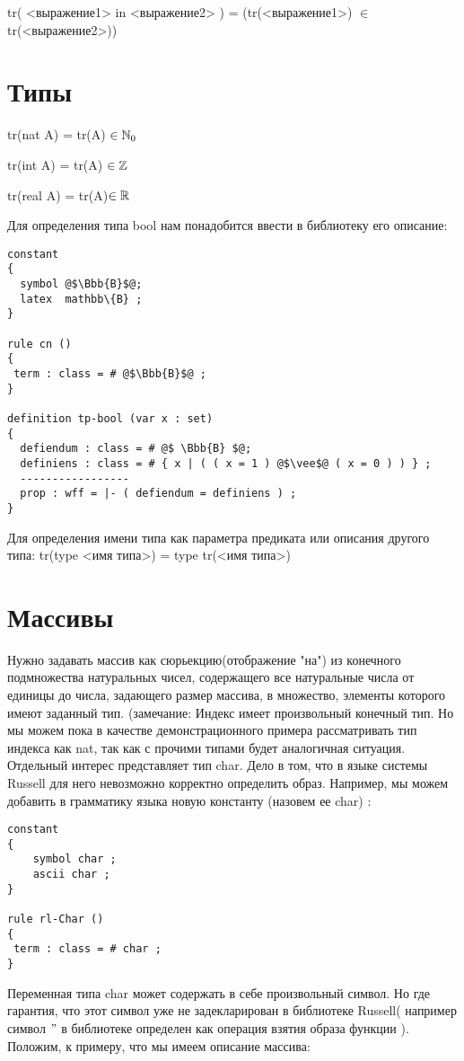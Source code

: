 \documentclass[10pt,a4paper]{article}
\begin{document}
tr( <выражение1> in <выражение2> )  =  (tr(<выражение1>) $\in$ tr(<выражение2>))


\section{Типы}

tr(nat A)  =  tr(A) $\in \Bbb{N}_{0}$

tr(int A)  =  tr(A) $\in \Bbb{Z}$

tr(real A) =  tr(A)$\in \Bbb{R} $

Для определения типа bool нам понадобится ввести в библиотеку его описание:
\begin{lstlisting}
constant
{
  symbol @$\Bbb{B}$@;
  latex  mathbb\{B} ;
}

rule cn ()
{
 term : class = # @$\Bbb{B}$@ ;
}

definition tp-bool (var x : set)
{
  defiendum : class = # @$ \Bbb{B} $@;
  definiens : class = # { x | ( ( x = 1 ) @$\vee$@ ( x = 0 ) ) } ;
  -----------------
  prop : wff = |- ( defiendum = definiens ) ;
}
\end{lstlisting}

\par Для определения имени типа как параметра предиката или описания другого типа:
tr(type <имя типа>)  =  type tr(<имя типа>)

\section{Массивы}


Нужно задавать массив как сюрьекцию(отображение "на") из конечного подмножества натуральных чисел, содержащего все натуральные числа от единицы до числа, задающего размер массива, в множество, элементы которого имеют заданный тип.
(замечание: Индекс имеет произвольный конечный тип. Но мы можем пока в качестве демонстрационного примера рассматривать тип индекса как nat, так как с прочими типами будет аналогичная ситуация. Отдельный интерес представляет тип char. Дело в том, что в языке системы Russell для него невозможно корректно определить образ. Например, мы можем добавить в грамматику языка новую константу (назовем ее char) :

\begin{lstlisting}
constant
{
	symbol char ;
	ascii char ;
}

rule rl-Char ()
{
 term : class = # char ;
}

\end{lstlisting}
Переменная типа char может содержать в себе произвольный символ. Но где гарантия, что этот символ уже не задекларирован в библиотеке Russell( например символ $"$ в библиотеке определен как операция взятия образа функции ).
Положим, к примеру, что мы имеем описание массива:
\end{document}
